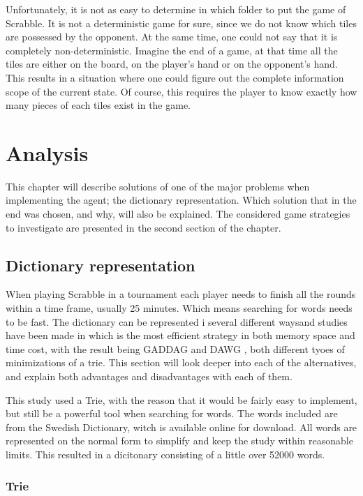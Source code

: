 \documentclass[a4paper, 12pt]{report}
\begin{document}
Unfortunately, it is not as easy to determine in which folder to put the game of Scrabble. It is not a deterministic game for sure, since we do not know which tiles are possessed by the opponent. At the same time, one could not say that it is completely non-deterministic. Imagine the end of a game, at that time all the tiles are either on the board, on the player's hand or on the opponent's hand. This results in a situation where one could figure out the complete information scope of the current state. Of course, this requires the player to know exactly how many pieces of each tiles exist in the game.

\chapter{Analysis}
This chapter will describe solutions of one of the major problems when implementing the agent; the dictionary representation. Which solution that in the end was chosen, and why, will also be explained. The considered game strategies to investigate are presented in the second section of the chapter.

\section{Dictionary representation}
When playing Scrabble in a tournament each player needs to finish all the rounds within a time frame, usually 25 minutes. Which means searching for words needs to be fast. The dictionary can be represented i several different waysand studies have been made in which is the most efficient strategy in both memory space and time cost, with the result being GADDAG and DAWG \cite{faster}\cite{fastest}, both different tyoes of minimizations of a trie. This section will look deeper into each of the alternatives, and explain both advantages and disadvantages with each of them.

This study used a Trie, with the reason that it would be fairly easy to implement, but still be a powerful tool when searching for words. The words included are from the Swedish Dictionary, witch is available online for download. All words are represented on the normal form to simplify and keep the study within reasonable limits. This resulted in a dicitonary consisting of a little over 52000 words.

\subsection{Trie}
\end{document}
